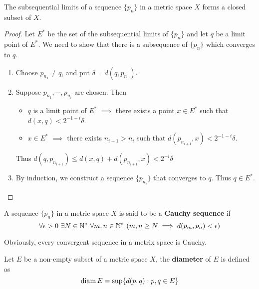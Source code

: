     \begin{theo}
        The subsequential limits of a sequence $\{p_n\}$ in a metric space $X$ forms a closed subset of $X$.
    \end{theo}
    \begin{framed}
        \begin{proof}
            Let $E^*$ be the set of the subsequential limits of $\{p_n\}$ and let $q$ be a limit point of $E^*$. We need to show that there is a subsequence of $\{p_n\}$ which converges to $q$.

            \begin{enumerate}
                \item Choose $p_{n_1} \neq q$, and put $\delta = d(q, p_{n_1})$.

                \item Suppose $p_{n_1}, \cdots, p_{n_i}$ are chosen. Then 
            \begin{itemize}
                \item $q$ is a limit point of $E^*$ $\implies$ there exists a point $x \in E^*$ such that $d(x, q) < 2^{-1-i} \delta$.
                \item $x \in E^*$ $\implies$ there exists $n_{i+1} > n_{i}$ such that $d(p_{n_{i+1}}, x) < 2^{-1-i} \delta$.
            \end{itemize}
            
            Thus $d(q, p_{n_{i+1}}) \leq d(x,q)+d(p_{n_{i+1}}, x) < 2^{-i} \delta$

            \item By induction, we construct a sequence $\{p_{n_{i}} \}$ that converges to $q$. Thus $q \in E^*$.
            \end{enumerate}
        \end{proof}
    \end{framed}

    \begin{defi}
        A sequence $\{p_n\}$ in a metric space $X$ is said to be a \textbf{Cauchy sequence} if 
        \begin{equation}
            \forall \epsilon > 0 \ \exists N \in \N^* \ \forall m,n \in \N^* \ (m,n \geq N \implies d(p_m, p_n) < \epsilon)
        \end{equation}
    \end{defi}

    Obviously, every convergent sequence in a metrix space is Cauchy.

    \begin{defi}
        Let $E$ be a non-empty subset of a metric space $X$, the \textbf{diameter} of $E$ is defined as
        \begin{equation}
            \operatorname{diam} E = \sup \{ d(p,q) : p, q \in E \}
        \end{equation}
    \end{defi}

